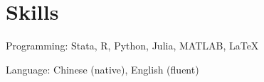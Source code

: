 \documentclass[letterpaper]{article}
\def\footerlink{}
\renewenvironment{itemize}{
  \begin{list}{}{
    \setlength{\leftmargin}{0.35em}
  }
}{
  \end{list}
}
\begin{document}
\section*{Skills}
\begin{itemize}
\item Programming: Stata, R, Python, Julia, MATLAB, \LaTeX
\item Language: Chinese (native), English (fluent)
\end{itemize}


\bigskip
\iffalse
\begin{center}
  \begin{footnotesize}
    Last updated: \today \\
    \href{\footerlink}{\texttt{\footerlink}}
  \end{footnotesize}
\end{center}
\fi
\end{document}
